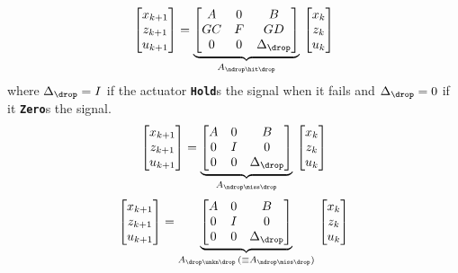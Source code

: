 %
\begin{equation}
    \begin{bmatrix}
        x_{k+1} \\
        z_{k+1} \\
        u_{k+1} \\
    \end{bmatrix} = \underbrace{\begin{bmatrix}
        A  & 0 & B \\
        GC & F & GD \\
        0  & 0 & \Delta_\drop \\
    \end{bmatrix}}_{A_{\ndrop\hit\drop}}\, \begin{bmatrix}
        x_{k} \\
        z_{k} \\
        u_{k} \\
    \end{bmatrix}
\end{equation}
%
where $\Delta_\drop = I$ if the actuator \textbf{\texttt{Hold}}s the signal when it fails and $\Delta_\drop = 0$ if it \textbf{\texttt{Zero}}s the signal.
%
\begin{equation}
    \begin{bmatrix}
        x_{k+1} \\
        z_{k+1} \\
        u_{k+1} \\
    \end{bmatrix} = \underbrace{\begin{bmatrix}
        A & 0 & B \\
        0 & I & 0 \\
        0 & 0 & \Delta_\drop \\
    \end{bmatrix}}_{A_{\ndrop\miss\drop}}\, \begin{bmatrix}
        x_{k} \\
        z_{k} \\
        u_{k} \\
    \end{bmatrix}
\end{equation}
%
\begin{equation}
    \begin{bmatrix}
        x_{k+1} \\
        z_{k+1} \\
        u_{k+1} \\
    \end{bmatrix} = \underbrace{\begin{bmatrix}
        A & 0 & B \\
        0 & I & 0 \\
        0 & 0 & \Delta_\drop \\
    \end{bmatrix}}_{A_{\drop\unkn\drop}\, (\equiv A_{\ndrop\miss\drop})}\, \begin{bmatrix}
        x_{k} \\
        z_{k} \\
        u_{k} \\
    \end{bmatrix}
\end{equation}

